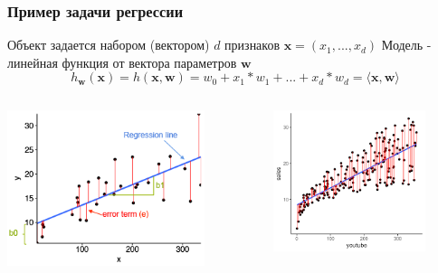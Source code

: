 \documentclass[notheorems]{beamer} %
\begin{document}
\begin{frame}
	\frametitle{Пример задачи регрессии}
	Объект задается набором (вектором) $d$ признаков $\textbf{x}=(x_1, ..., x_d)$
	Модель - линейная функция от вектора параметров $\textbf{w}$
	$$h_{\textbf{w}}(\textbf{x})=h(\textbf{x}, \textbf{w})=w_0 + x_1*w_1 + ... +x_d*w_d=\langle \textbf{x},\textbf{w} \rangle  $$
	\begin{columns}
		\begin{column}{.5\linewidth}\centering
			\includegraphics[width=0.8\textwidth]{img/linear_regression}
		\end{column}
		\begin{column}{.5\linewidth}\centering
			\includegraphics[width=0.8\textwidth]{img/lr_youtube}
	\end{column}
	\end{columns}
\end{frame}
\end{document}
